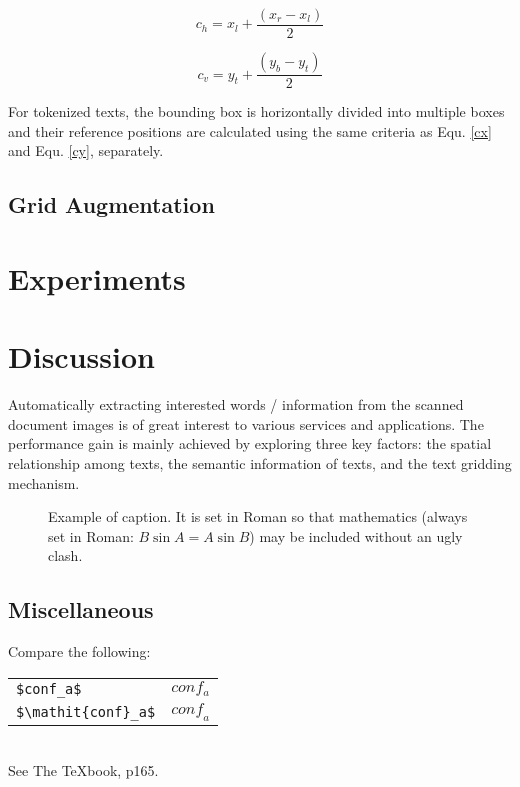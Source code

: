 \documentclass[10pt,twocolumn,letterpaper]{article}
\begin{document}
\begin{equation}
\label{cx}
c_h = x_l + \frac{(x_r - x_l)}{2}
\end{equation}

\begin{equation}
\label{cy}
c_v = y_t + \frac{(y_b - y_t)}{2}
\end{equation}

For tokenized texts, the bounding box is horizontally divided into multiple boxes and their reference positions are calculated using the same criteria as Equ. \ref{cx} and Equ. \ref{cy}, separately.

\subsection{Grid Augmentation}

\section{Experiments}


\section{Discussion}
Automatically extracting interested words / information from the scanned document images is of great interest to various services and applications. The performance gain is mainly achieved by exploring three key factors: the spatial relationship among texts, the semantic information of texts, and the text gridding mechanism.


\begin{figure}[t]
\begin{center}
\fbox{\rule{0pt}{2in} \rule{0.9\linewidth}{0pt}}
\end{center}
   \caption{Example of caption.  It is set in Roman so that mathematics
   (always set in Roman: $B \sin A = A \sin B$) may be included without an
   ugly clash.}
\label{fig:long}
\label{fig:onecol}
\end{figure}

\subsection{Miscellaneous}

\noindent
Compare the following:\\
\begin{tabular}{ll}
 \verb'$conf_a$' &  $conf_a$ \\
 \verb'$\mathit{conf}_a$' & $\mathit{conf}_a$
\end{tabular}\\
See The \TeX book, p165.
\end{document}
